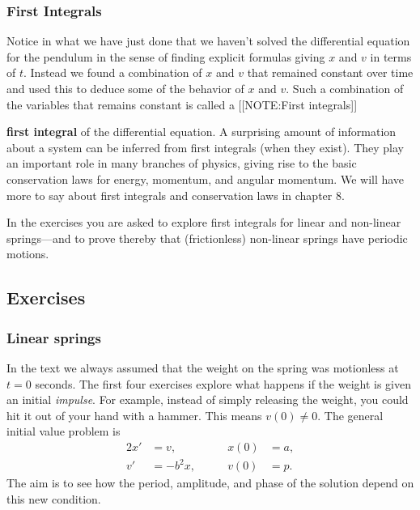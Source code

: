 \subsubsection{First Integrals}
\label{subsubsec:first-integrals}

Notice in what we have just done that we haven't solved the differential equation for the pendulum in the sense of finding explicit formulas giving $x$ and $v$ in terms of $t$.  Instead we found a combination of $x$ and $v$ that remained constant over time and used this to deduce some of the behavior of $x$ and $v$.  Such a combination of the variables that remains constant is called a 
[[NOTE:First integrals]]

{\bf first integral}\label{firstint} of the differential equation.  A surprising amount of information about a system can be inferred from first integrals (when they exist).  They play an important role in many branches of physics, giving rise to the basic conservation laws for energy, momentum, and angular momentum.  We will have more to say about first integrals and conservation laws in chapter 8.

In the exercises you are asked to explore first integrals for linear
and non-linear springs---and to prove thereby that (frictionless)
non-linear springs have periodic motions.

\subsection{Exercises}
\label{subsec:exercises}

\subsubsection{Linear springs}
\label{subsubsec:linear-springs}

In the text we always assumed that the weight on the spring was
motionless at $t = 0$ seconds.  The first four exercises explore what
happens if the weight is given an initial {\em
  impulse}. For example, instead of simply releasing
the weight, you could hit it out of your hand with a hammer.  This
means $v(0) \neq 0$.  The general initial value problem is
\begin{alignat*}{2}
x' &= v,      &\qquad  x(0) &= a, \\
v' &= -b^2 x, &\qquad  v(0) &= p.
\end{alignat*}
The aim is to see how the period, amplitude, and phase of the solution
depend on this new condition.


